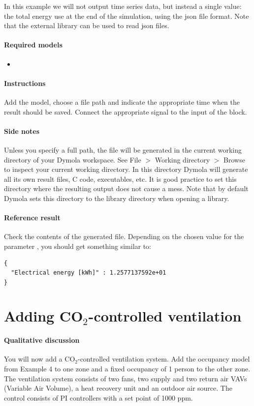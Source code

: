 \documentclass[10pt,a4paper]{article}
\begin{document}
In this example we will not output time series data, but instead a single value: the total
energy use at the end of the simulation, using the json file format. 
Note that the external library  can be used to read json files.


\paragraph{Required models}
\begin{itemize}
\item {}
\end{itemize}

\paragraph{Instructions}
Add the model, choose a file path and indicate the appropriate time when 
the result should be saved.
Connect the appropriate signal to the input of the block.

\paragraph{Side notes}
Unless you specify a full path, the file will be generated in
the current working directory of your Dymola workspace.
See File $>$ Working directory $>$ Browse to inspect your current
working directory.
In this directory Dymola will generate all its own result files, C code, executables, etc.
It is good practice to set this directory where the resulting output does not cause a mess.
Note that by default Dymola sets this directory to the library directory when opening a library.

\paragraph{Reference result}
Check the contents of the generated file. 
Depending on the chosen value for the parameter , 
you should get something similar to:
\begin{verbatim}
{
  "Electrical energy [kWh]" : 1.2577137592e+01
}

\end{verbatim}


\section{Adding CO$_2$-controlled ventilation}
\paragraph{Qualitative discussion}
You will now add a CO$_2$-controlled ventilation system.
Add the occupancy model from Example 4 to one zone
and a fixed occupancy of 1 person to the other zone.
The ventilation system consists of two fans, two supply and two return air
VAVs (Variable Air Volume), a heat recovery unit and an outdoor air source.
The control consists of PI controllers with a set point of 1000 ppm.
\end{document}
